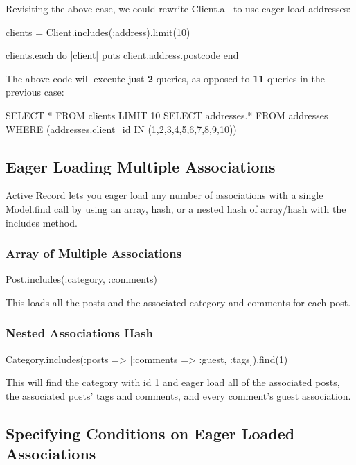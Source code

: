 \documentclass[10pt]{book}
\newenvironment{code}{%
  \scriptsize
    \verbatim
}{%
    \endverbatim
    \newline
}
\begin{document}
Revisiting the above case, we could rewrite Client.all to use eager load addresses:
\begin{code}
clients = Client.includes(:address).limit(10)
 
clients.each do |client|
  puts client.address.postcode
end
\end{code}

The above code will execute just \textbf{2} queries, as opposed to \textbf{11} queries in the previous case:
\begin{code}
SELECT * FROM clients LIMIT 10
SELECT addresses.* FROM addresses
  WHERE (addresses.client_id IN (1,2,3,4,5,6,7,8,9,10))
\end{code}

\subsection{ Eager Loading Multiple Associations}

Active Record lets you eager load any number of associations with a single Model.find call by using an array, hash, or a nested hash of array/hash with the includes method.

\subsubsection{ Array of Multiple Associations}
\begin{code}
Post.includes(:category, :comments)
\end{code}

This loads all the posts and the associated category and comments for each post.

\subsubsection{ Nested Associations Hash}
\begin{code}
Category.includes(:posts => [{:comments => :guest}, :tags]).find(1)
\end{code}

This will find the category with id 1 and eager load all of the  associated posts, the associated posts’ tags and comments, and every  comment’s guest association.

\subsection{ Specifying Conditions on Eager Loaded Associations}
\end{document}
